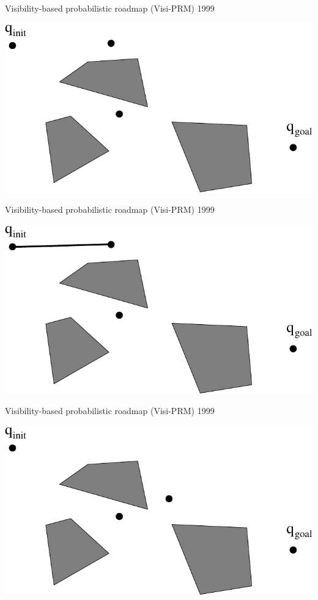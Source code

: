 \begin{frame} {Visibility-based probabilistic roadmap (Visi-PRM) 1999}
\centerline {
  \includegraphics[width=.8\linewidth]{figures/VPRM6.pdf}
}
\end{frame}

\begin{frame} {Visibility-based probabilistic roadmap (Visi-PRM) 1999}
\centerline {
  \includegraphics[width=.8\linewidth]{figures/VPRM7.pdf}
}
\end{frame}

\begin{frame} {Visibility-based probabilistic roadmap (Visi-PRM) 1999}
\centerline {
  \includegraphics[width=.8\linewidth]{figures/VPRM8.pdf}
}
\end{frame}


